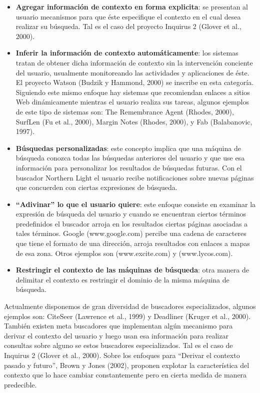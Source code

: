 \begin{itemize}

\item \textbf{Agregar información de contexto en forma explicita}: se presentan
al usuario
mecanismos para que éste especifique el contexto en el cual desea realizar su
búsqueda. Tal es el caso del proyecto Inquirus 2 (Glover et al., 2000).

\item \textbf{Inferir la información de contexto automáticamente}: los sistemas
tratan de obtener
dicha información de contexto sin la intervención conciente del usuario,
usualmente
monitoreando las actividades y aplicaciones de éste. El proyecto Watson (Budzik
y
Hammond, 2000) se inscribe en esta categoría. Siguiendo este mismo enfoque hay
sistemas que recomiendan enlaces a sitios Web dinámicamente mientras el usuario
realiza sus tareas, algunos ejemplos de este tipo de sistemas son: The
Remembrance
Agent (Rhodes, 2000), SurfLen (Fu et al., 2000), Margin Notes (Rhodes, 2000), y
Fab (Balabanovic, 1997).

\item \textbf{Búsquedas personalizadas}: este concepto implica que una máquina
de búsqueda
conozca todas las búsquedas anteriores del usuario y que use esa información
para
personalizar los resultados de búsquedas futuras. Con el buscador Northern Light
el
usuario recibe notificaciones sobre nuevas páginas que concuerden con ciertas
expresiones de búsqueda.

\item \textbf{“Adivinar” lo que el usuario quiere}: este enfoque consiste en
examinar la expresión
de búsqueda del usuario y cuando se encuentran ciertos términos predefinidos el
buscador arroja en los resultados ciertas páginas asociadas a tales términos.
Google
(www.google.com) percibe una cadena de caracteres que tiene el formato de una
dirección, arroja resultados con enlaces a mapas de esa zona. Otros ejemplos son
(www.excite.com) y (www.lycos.com).

\item \textbf{Restringir el contexto de las máquinas de búsqueda}: otra manera
de delimitar el
contexto es restringir el dominio de la misma máquina de búsqueda. 

\end{itemize}


Actualmente disponemos de gran diversidad de buscadores especializados, algunos
ejemplos son:
CiteSeer (Lawrence et al., 1999) y Deadliner (Kruger et al., 2000). También
existen
meta buscadores que implementan algún mecanismo para derivar el contexto del
usuario y luego usan esa información para realizar consultas sobre alguno se
estos
buscadores especializados. Tal es el caso de Inquirus 2 (Glover et al., 2000).
Sobre los enfoques para “Derivar el contexto pasado y futuro”, Brown y Jones
(2002),
proponen explotar la característica del contexto que lo hace cambiar
constantemente
pero en cierta medida de manera predecible.

